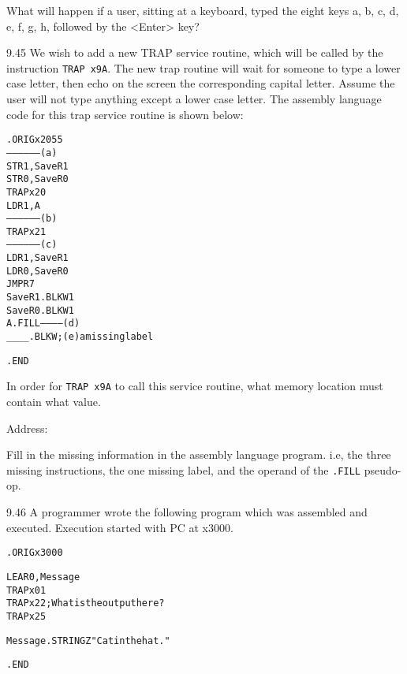 \documentclass{patt}
\begin{document}
\begin{exercises}
What will happen if a user, sitting at a keyboard, typed the eight keys a, b, c, d, e, f, g, h, followed by the \textless Enter\textgreater { }key? 

\item[9.45] We wish to add a new TRAP service routine, which will be called
by the instruction {\tt TRAP~x9A}.  The new trap routine will wait for someone
to type a lower case letter, then echo on the screen the corresponding capital
letter. Assume the user will not type anything except a lower case letter.  The
assembly language code for this trap service routine is shown below: \\

\begin{alltt}
        .ORIG 		x2055
        ----------------- (a)
        ST R1, SaveR1
        ST R0, SaveR0
        TRAP x20
        LD R1, A
        ----------------- (b)
        TRAP x21
        ----------------- (c)
        LD R1, SaveR1
        LD R0, SaveR0
        JMP R7
SaveR1 .BLKW 1
SaveR0 .BLKW 1
A      .FILL ------------ (d)
____   .BLKW           ;  (e) a missing label 

       .END
\end{alltt}


\noindent In order for {\tt TRAP~x9A} to call this service routine, what
memory location must contain what value.
\\

\vspace{.25in}

\noindent Address:
\hspace{1in
Value:} 

\vspace{.25in}

\noindent Fill in the missing information in the assembly language program.
i.e, the three missing instructions, the one missing label, and the operand
of the {\tt .FILL} pseudo-op.

\item[9.46] A programmer wrote the following program which was assembled and executed. Execution started with PC at x3000. 

\begin{alltt}
         .ORIG x3000

         LEA R0, Message	
         TRAP x01
         TRAP x22	; What is the output here?
         TRAP x25

Message	.STRINGZ "Cat in the hat."

        .END
\end{alltt}


\end{exercises}
\end{document}
